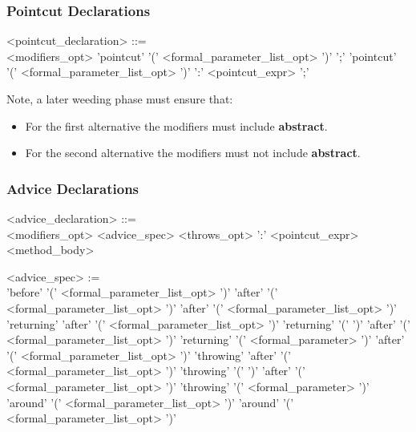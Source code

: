 \subsubsection{Pointcut Declarations}

\begin{minipage}{6in}
\begin{blue}
\begin{grammar}
<pointcut_declaration> ::= \hspace{1in} \\
      {\red <modifiers_opt>} 'pointcut' {} 
             '(' {\red <formal_parameter_list_opt>} ')' ';'
 'pointcut' {} 
             '(' {\red <formal_parameter_list_opt>} ')' 
             ':' {\blue <pointcut_expr>} ';'
\end{grammar}
\end{blue}
\end{minipage}

\noindent Note, a later weeding phase must ensure that:
\begin{itemize}
\item For the first alternative the modifiers must include {\bf abstract}.
\item For the second alternative the modifiers must not include {\bf abstract}.
\end{itemize}

\subsubsection{Advice Declarations}

\begin{minipage}{6in}
\begin{blue}
\begin{grammar}
<advice_declaration> ::= \hspace{1in} \\
      {\red <modifiers_opt>} <advice_spec> {\red <throws_opt>} ':'
      {\blue <pointcut_expr>} {\red <method_body>}

<advice_spec> :=  \hspace{1in} \\
       'before' '(' {\red <formal_parameter_list_opt>} ')'
\alt   'after'  '(' {\red <formal_parameter_list_opt>} ')'
\alt   'after'  '(' {\red <formal_parameter_list_opt>} ')' 'returning'
\alt   'after'  '(' {\red <formal_parameter_list_opt>} ')' 'returning' '(' ')'
\alt   'after'  '(' {\red <formal_parameter_list_opt>} ')' 'returning'
             '(' {\red <formal_parameter>} ')'
\alt   'after'  '(' {\red <formal_parameter_list_opt>} ')' 'throwing'
\alt   'after'  '(' {\red <formal_parameter_list_opt>} ')' 'throwing' '(' ')'
\alt   'after'  '(' {\red <formal_parameter_list_opt>} ')' 'throwing'
             '(' {\red <formal_parameter>} ')'
 'around' '(' {\red <formal_parameter_list_opt>} ')'
 'around' '(' {\red <formal_parameter_list_opt>} ')'
\end{grammar}
\end{blue}
\end{minipage}

